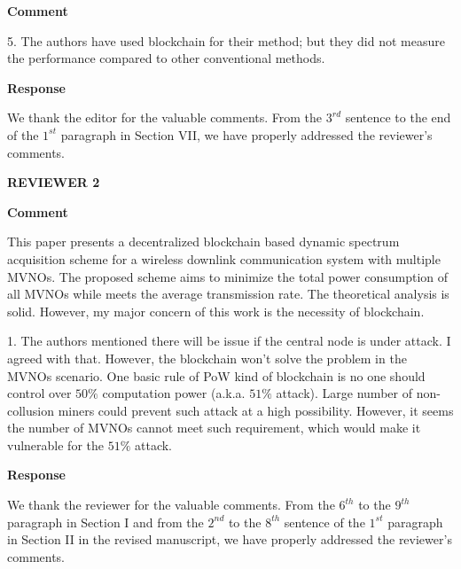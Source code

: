 \documentclass[12pt,draftcls, onecolumn]{IEEEtran}
\begin{document}
\vspace{3mm}
\noindent\textcolor[rgb]{1.00,0.00,0.00}{\textbf{Comment}}
\vspace{3mm}

5. The authors have used blockchain for their method; but they did not measure the performance compared to other conventional methods.

\vspace{3mm}
\noindent\textcolor[rgb]{0.00,0.00,1.00}{\textbf{Response}}
\vspace{3mm}

We thank the editor for the valuable comments. From the $ 3^{rd} $ sentence to the end of the $ 1^{st} $ paragraph in Section VII, we have properly addressed the reviewer's comments.

\newpage

\vspace{5mm} \noindent\textcolor[rgb]{1.00,0.00,0.00}{\textbf{REVIEWER 2}}

\vspace{3mm}
\noindent\textcolor[rgb]{1.00,0.00,0.00}{\textbf{Comment}}
\vspace{3mm}

This paper presents a decentralized blockchain based dynamic spectrum acquisition scheme for a wireless downlink communication system with multiple MVNOs. The proposed scheme aims to minimize the total power consumption of all MVNOs while meets the average transmission rate. The theoretical analysis is solid. However, my major concern of this work is the necessity of blockchain. 

1. The authors mentioned there will be issue if the central node is under attack. I agreed with that. However, the blockchain won't solve the problem in the MVNOs scenario. One basic rule of PoW kind of blockchain is no one should control over $ 50\% $ computation power (a.k.a. $ 51\% $ attack). Large number of non-collusion miners could prevent such attack at a high possibility. However, it seems the number of MVNOs cannot meet such requirement, which would make it vulnerable for the $ 51\% $ attack.

\vspace{3mm} \noindent\textcolor[rgb]{0.00,0.00,1.00}{\textbf{Response}}
\vspace{2mm}

We thank the reviewer for the valuable comments. From the $ 6^{th} $ to the $ 9^{th} $ paragraph in Section I and from the $ 2^{nd} $ to the $ 8^{th} $ sentence of the $ 1^{st} $ paragraph in Section II in the revised manuscript, we have properly addressed the reviewer's comments.
\end{document}
